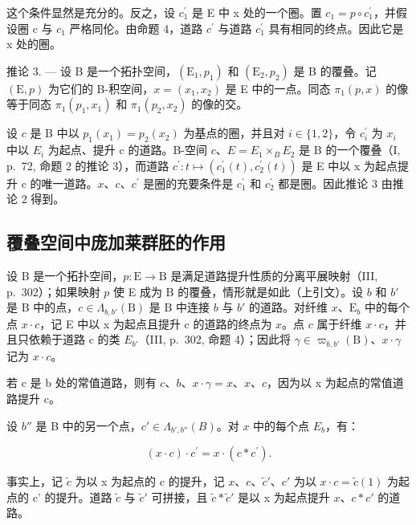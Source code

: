 这个条件显然是充分的。反之，设 \(c_{1}^{\prime}\) 是 E 中 x 处的一个圈。置 \(c_{1} = p \circ c_{1}^{\prime}\)，并假设圈 c 与 \(c_{1}\) 严格同伦。由命题 4，道路 \(c^{\prime}\) 与道路 \(c_{1}^{\prime}\) 具有相同的终点。因此它是 x 处的圈。

推论 3. --- 设 B 是一个拓扑空间，\((\mathrm{E}_{1}, p_{1})\) 和 \((\mathrm{E}_{2}, p_{2})\) 是 B 的覆叠。记 \((\mathrm{E}, p)\) 为它们的 B-积空间，\(x = (x_{1}, x_{2})\) 是 E 中的一点。同态 \(\pi_{1}(p, x)\) 的像等于同态 \(\pi_{1}(p_{1}, x_{1})\) 和 \(\pi_{1}(p_{2}, x_{2})\) 的像的交。

设 \(c\) 是 B 中以 \(p_{1}(x_{1}) = p_{2}(x_{2})\) 为基点的圈，并且对 \(i \in \{1, 2\}\)，令 \(c_{i}^{\prime}\) 为 \(x_i\) 中以 \(E_i\) 为起点、提升 c 的道路。B-空间 \(c\)、\(E = E_{1} \times_{B} E_{2}\) 是 B 的一个覆叠（I, p.~72, 命题 2 的推论 3），而道路 \(c^{\prime}: t \mapsto (c_{1}^{\prime}(t), c_{2}^{\prime}(t))\) 是 E 中以 x 为起点提升 c 的唯一道路。\(x\)、\(c\)、\(c^{\prime}\) 是圈的充要条件是 \(c_{1}^{\prime}\) 和 \(c_{2}^{\prime}\) 都是圈。因此推论 3 由推论 2 得到。

\subsection{覆叠空间中庞加莱群胚的作用}

设 B 是一个拓扑空间，\(p \colon \mathrm{E} \to \mathrm{B}\) 是满足道路提升性质的分离平展映射（III, p.~302）；如果映射 \(p\) 使 E 成为 B 的覆叠，情形就是如此（上引文）。设 \(b\) 和 \(b'\) 是 B 中的点，\(c \in \Lambda_{b,b'}(\mathrm{B})\) 是 B 中连接 \(b\) 与 \(b'\) 的道路。对纤维 \(x\)、\(\mathrm{E}_b\) 中的每个点 \(x \cdot c\)，记 E 中以 x 为起点且提升 c 的道路的终点为 \(x\)。点 \(c\) 属于纤维 \(x \cdot c\)，并且只依赖于道路 c 的类 \(E_{b'}\)（III, p.~302, 命题 4）；因此将 \(\gamma \in \varpi_{b,b'}(\mathrm{B})\)、\(x \cdot \gamma\) 记为 \(x \cdot c\)。

若 c 是 b 处的常值道路，则有 \(c\)、\(b\)、\(x \cdot \gamma = x\)、\(x\)、\(c\)，因为以 x 为起点的常值道路提升 c。

设 \(b''\) 是 B 中的另一个点，\(c' \in \Lambda_{b',b''}(B)\)。对 \(x\) 中的每个点 \(E_b\)，有：

\[
(x \cdot c) \cdot c ^ {\prime} = x \cdot (c * c ^ {\prime}).\tag{1}
\]

事实上，记 \(\widetilde{c}\) 为以 x 为起点的 c 的提升，记 \(x\)、\(c\)、\(\widetilde{c}'\)、\(c'\) 为以 \(x \cdot c = \widetilde{c}(1)\) 为起点的 c' 的提升。道路 \(\widetilde{c}\) 与 \(\widetilde{c}'\) 可拼接，且 \(\widetilde{c} * \widetilde{c}'\) 是以 x 为起点提升 \(x\)、\(c * c'\) 的道路。

